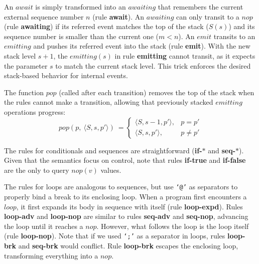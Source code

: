 \documentclass{acm_proc_article-sp}
\newcommand{\CEU}{\textsc{C\'{e}u}\xspace}
\newcommand{\code}[1] {{\small{\texttt{#1}}}}
\newcommand{\LL}{\langle}
\newcommand{\RR}{\rangle}
\newcommand{\rr}[1] {{\textbf{\scriptsize{#1}}}}
\newcommand{\1}{\;}
\newcommand{\2}{\;\;}
\newcommand{\3}{\;\;\;}
\newcommand{\5}{\;\;\;\;\;}
\begin{document}
An $await$ is simply transformed into an $awaiting$ that remembers the current 
external sequence number $n$ (rule \rr{await}).
An $awaiting$ can only transit to a $nop$ (rule \rr{awaiting}) if its referred 
event matches the top of the stack ($S(s)$) and its sequence number is smaller 
than the current one ($m<n$).
%
%
An $emit$ transits to an $emitting$ and pushes its referred event into the 
stack (rule \rr{emit}).
With the new stack level $s+1$, the $emitting(s)$ in rule \rr{emitting} cannot 
transit, as it expects the parameter $s$ to match the current stack level.
This trick enforces the desired stack-based behavior for internal events.

The function $pop$ (called after each transition) removes the top of the stack 
when the rules cannot make a transition, allowing that previously stacked 
$emitting$ operations progress:
%
\[
pop(p,~\LL S, s, p' \RR)~=
\begin{cases}
    \LL S, s-1, p' \RR, & p = p' \\
    \LL S, s,   p' \RR, & p \neq p'
\end{cases}
\]
%

The rules for conditionals and sequences are straightforward (\rr{if-$*$} and 
\rr{seq-$*$}).
%
Given that the semantics focus on control, note that rules \rr{if-true} and 
\rr{if-false} are the only to query $nop(v)$ values.

The rules for loops are analogous to sequences, but use \code{`@'} as 
separators to properly bind a break to its enclosing loop.
%
When a program first encounters a $loop$, it first expands its body in sequence 
with itself (rule \rr{loop-expd}).
Rules \rr{loop-adv} and \rr{loop-nop} are similar to rules \rr{seq-adv} and 
\rr{seq-nop}, advancing the loop until it reaches a $nop$.
However, what follows the loop is the loop itself (rule \rr{loop-nop}).
Note that if we used \code{`;'} as a separator in loops, rules \rr{loop-brk} 
and \rr{seq-brk} would conflict.
%
Rule \rr{loop-brk} escapes the enclosing loop, transforming everything into a 
$nop$.
\end{document}

